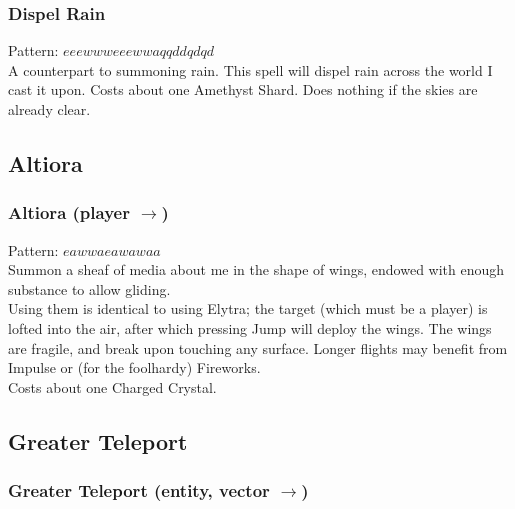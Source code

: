 \documentclass[12pt]{article}
\begin{document}
  \label{sec: patterns/great_spells/weather_manip@hexcasting:dispel_rain}
\subsubsection*{Dispel Rain}

    Pattern: $eeewwweeewwaqqddqdqd$\\
      A counterpart to summoning rain. This spell will dispel rain across the world I cast it upon. Costs about one Amethyst Shard. Does nothing if the skies are already clear.\\

\newpage

\label{sec:patterns/great_spells/altiora}
\subsection*{Altiora}


  \label{sec: patterns/great_spells/altiora@hexcasting:flight}
\subsubsection*{Altiora (player $\rightarrow$)}

    Pattern: $eawwaeawawaa$\\
      Summon a sheaf of media about me in the shape of wings, endowed with enough substance to allow gliding.\\


  
    Using them is identical to using Elytra; the target (which must be a player) is lofted into the air, after which pressing Jump will deploy the wings. The wings are fragile, and break upon touching any surface. Longer flights may benefit from Impulse or (for the foolhardy) Fireworks.\\Costs about one Charged Crystal.\\

\newpage

\label{sec:patterns/great_spells/teleport}
\subsection*{Greater Teleport}


  \label{sec: patterns/great_spells/teleport@hexcasting:teleport/great}
\subsubsection*{Greater Teleport (entity, vector $\rightarrow$)}
\end{document}
